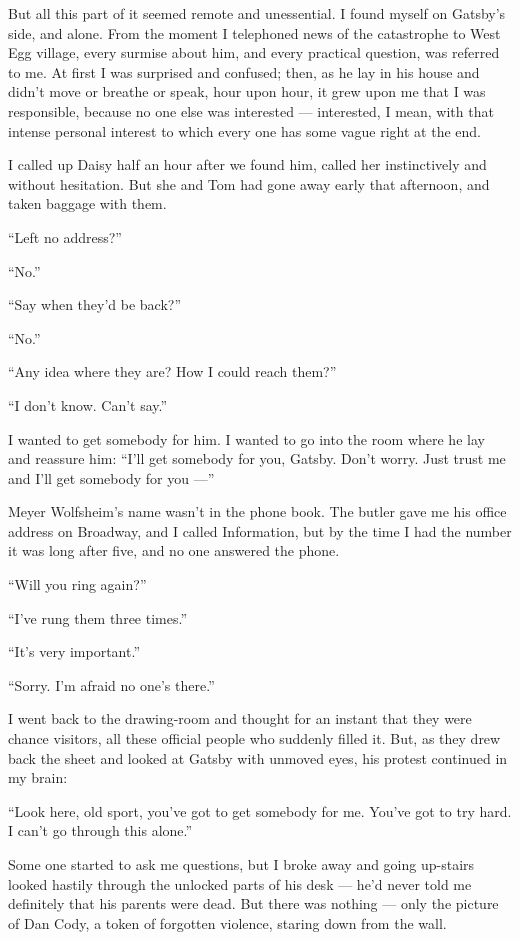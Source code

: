 \documentclass{znotebook}
\begin{document}
But all this part of it seemed remote and unessential. I found myself on Gatsby's side, and alone. From the moment I telephoned news of the catastrophe to West Egg village, every surmise about him, and every practical question, was referred to me. At first I was surprised and confused; then, as he lay in his house and didn't move or breathe or speak, hour upon hour, it grew upon me that I was responsible, because no one else was interested ---{} interested, I mean, with that intense personal interest to which every one has some vague right at the end.

I called up Daisy half an hour after we found him, called her instinctively and without hesitation. But she and Tom had gone away early that afternoon, and taken baggage with them.

``Left no address?''

``No.''

``Say when they'd be back?''

``No.''

``Any idea where they are? How I could reach them?''

``I don't know. Can't say.''

I wanted to get somebody for him. I wanted to go into the room where he lay and reassure him: ``I'll get somebody for you, Gatsby. Don't worry. Just trust me and I'll get somebody for you ---''

Meyer Wolfsheim's name wasn't in the phone book. The butler gave me his office address on Broadway, and I called Information, but by the time I had the number it was long after five, and no one answered the phone.

``Will you ring again?''

``I've rung them three times.''

``It's very important.''

``Sorry. I'm afraid no one's there.''

I went back to the drawing-room and thought for an instant that they were chance visitors, all these official people who suddenly filled it. But, as they drew back the sheet and looked at Gatsby with unmoved eyes, his protest continued in my brain:

``Look here, old sport, you've got to get somebody for me. You've got to try hard. I can't go through this alone.''

Some one started to ask me questions, but I broke away and going up-stairs looked hastily through the unlocked parts of his desk ---{} he'd never told me definitely that his parents were dead. But there was nothing ---{} only the picture of Dan Cody, a token of forgotten violence, staring down from the wall.
\end{document}
